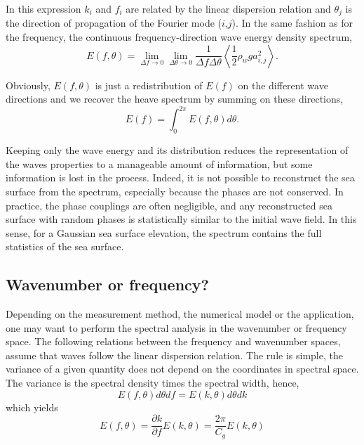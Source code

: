 In this expression $k_{i}$ and $f_i$ are related by the linear dispersion relation and $\theta_{j}$ is the direction of
propagation of the Fourier mode ($i$,$j$). In the same fashion as for the frequency, the continuous frequency-direction wave energy
density spectrum, 
\begin{equation}
E(f,\theta)=\lim_{\Delta f\to 0}\lim_{\Delta \theta\to 0}\frac{1}{\Delta f \Delta \theta} \left\langle \frac{1}{2} \rho_w g a_{i,j}^{2}\right\rangle .
\label{eq3.6}
\end{equation}

Obviously, $E(f,\theta)$ is just a redistribution of $E(f)$ on the different wave directions and we recover the heave spectrum by summing on these directions, 
\begin{equation}
E(f) = \int_{0}^{2\pi}  E(f,\theta)d\theta.
\label{eq3.16}
\end{equation}

Keeping only the wave energy and its distribution reduces the   representation of the waves properties to a manageable amount of information, 
but some information is lost in the 
process. Indeed, it is not possible to reconstruct the sea surface from the spectrum, especially because the phases  are not conserved. 
In practice, the phase couplings are often negligible, and any reconstructed sea surface with 
random phases is statistically similar to the initial wave field. In this sense, for a Gaussian sea surface elevation, the spectrum contains 
the full statistics of the sea surface.

 \subsection{Wavenumber or frequency?}
 Depending on the measurement method, the numerical model or the application, one may want to perform the spectral analysis in the wavenumber or
 frequency space. The following relations between the frequency and wavenumber spaces, assume that waves follow the linear
 dispersion relation. The rule is simple, the variance of a given quantity does not depend on the coordinates in spectral space. 
The  variance is the spectral density times the spectral width, hence,
 \begin{equation}
E(f,\theta)d\theta df = E(k,\theta)d\theta dk 
\label{eq:Eftheta_Ektheta1}
\end{equation}
 which yields
 \begin{equation}
E(f,\theta)=\frac{\partial k}{\partial f} E(k,\theta) = \frac{2\pi}{C_g} E(k,\theta)
\label{eq:Eftheta_Ektheta}
\end{equation}


